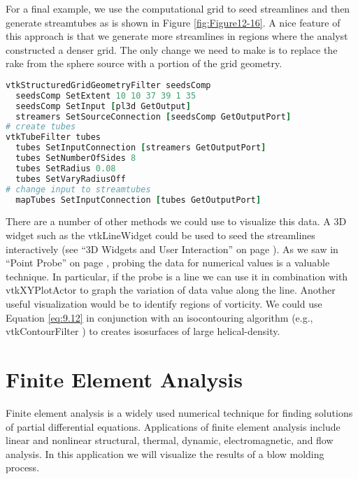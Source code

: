 For a final example, we use the computational grid to seed streamlines and then generate streamtubes as is shown in Figure \ref{fig:Figure12-16}. A nice feature of this approach is that we generate more streamlines in regions where the analyst constructed a denser grid. The only change
we need to make is to replace the rake from the sphere source with a portion of the grid geometry.

\begin{lstlisting}[language=TCL, caption={Use the computational grid to seed streamlines and then generate streamtubes.}]
vtkStructuredGridGeometryFilter seedsComp
  seedsComp SetExtent 10 10 37 39 1 35
  seedsComp SetInput [pl3d GetOutput]
  streamers SetSourceConnection [seedsComp GetOutputPort]
# create tubes
vtkTubeFilter tubes
  tubes SetInputConnection [streamers GetOutputPort]
  tubes SetNumberOfSides 8
  tubes SetRadius 0.08
  tubes SetVaryRadiusOff
# change input to streamtubes
  mapTubes SetInputConnection [tubes GetOutputPort]
\end{lstlisting}

There are a number of other methods we could use to visualize this data.
A 3D widget such as the vtkLineWidget could be used to seed the streamlines interactively (see ``3D Widgets and User Interaction'' on
page \pageref{sec:3D_widgets_user_interaction}). As we saw in ``Point Probe'' on page \pageref{subsec:examples.point_probe}, probing the data
for numerical values is a valuable technique. In particular, if the
probe is a line we can use it in combination with vtkXYPlotActor to
graph the variation of data value along the line. Another useful
visualization would be to identify regions of vorticity. We could use
Equation \ref{eq:9.12} in conjunction with an isocontouring algorithm
(e.g., vtkContourFilter ) to creates isosurfaces of large
helical-density.

\section{Finite Element Analysis}

Finite element analysis is a widely used numerical technique for finding solutions of partial differential equations. Applications of finite element analysis include linear and nonlinear structural, thermal, dynamic, electromagnetic, and flow analysis. In this application we will visualize the results of a blow molding process.

